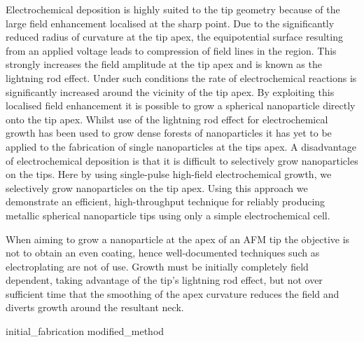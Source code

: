 \documentclass[12pt, a4paper, twoside]{book}
\begin{document}
Electrochemical deposition is highly suited to the tip geometry because of the large field enhancement localised at the sharp point. Due to the significantly reduced radius of curvature at the tip apex, the equipotential surface resulting from an applied voltage leads to compression of field lines in the region. This strongly increases the field amplitude at the tip apex and is known as the lightning rod effect. Under such conditions the rate of electrochemical reactions is significantly increased around the vicinity of the tip apex. By exploiting this localised field enhancement it is possible to grow a spherical nanoparticle directly onto the tip apex. Whilst use of the lightning rod effect for electrochemical growth has been used to grow dense forests of nanoparticles \cite{tian2006, yang2011} it has yet to be applied to the fabrication of single nanoparticles at the tips apex. A disadvantage of electrochemical deposition is that it is difficult to selectively grow nanoparticles on the tips. Here by using single-pulse high-field electrochemical growth, we selectively grow nanoparticles on the tip apex. Using this approach we demonstrate an efficient, high-throughput technique for reliably producing metallic spherical nanoparticle tips using only a simple electrochemical cell.

When aiming to grow a nanoparticle at the apex of an AFM tip the objective is not to obtain an even coating, hence well-documented techniques such as electroplating are not of use. Growth must be initially completely field dependent, taking advantage of the tip's lightning rod effect, but not over sufficient time that the smoothing of the apex curvature reduces the field and diverts growth around the resultant neck.

{initial_fabrication}
{modified_method}



\end{document}
